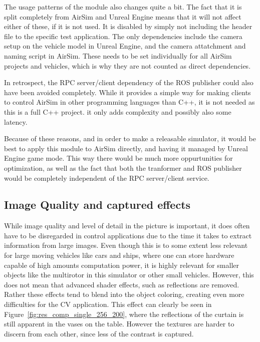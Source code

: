 The usage patterns of the module also changes quite a bit. The fact that it is split completely from AirSim and Unreal Engine means that it will not affect either of these, if it is not used. It is disabled by simply not including the header file to the specific test application. The only dependencies include the camera setup on the vehicle model in Unreal Engine, and the camera attatchment and naming script in AirSim. These needs to be set individually for all AirSim projects and vehicles, which is why they are not counted as direct dependencies.

In retrospect, the RPC server/client dependency of the ROS publisher could also have been avoided completely. While it provides a simple way for making clients to control AirSim in other programming languages than C++, it is not needed as this is a full C++ project. it only adds complexity and possibly also some latency.

Because of these reasons, and in order to make a releasable simulator, it would be best to apply this module to AirSim directly, and having it managed by Unreal Engine game mode. This way there would be much more oppurtunities for optimization, as well as the fact that both the tranformer and ROS publisher would be completely independent of the RPC server/client service.

\subsection{Image Quality and captured effects}

While image quality and level of detail in the picture is important, it does often have to be disregarded in control applications due to the time it takes to extract information from large images. Even though this is to some extent less relevant for large moving vehicles like cars and ships, where one can store hardware capable of high amounts computation power, it is highly relevant for smaller objects like the multirotor in this simulator or other small vehicles. However, this does not mean that advanced shader effects, such as reflections are removed. Rather these effects tend to blend into the object coloring, creating even more difficulties for the CV application. This effect can clearly be seen in Figure~\ref{fig:res_comp_single_256_200}, where the reflections of the curtain is still apparent in the vases on the table. However the textures are harder to discern from each other, since less of the contrast is captured.

